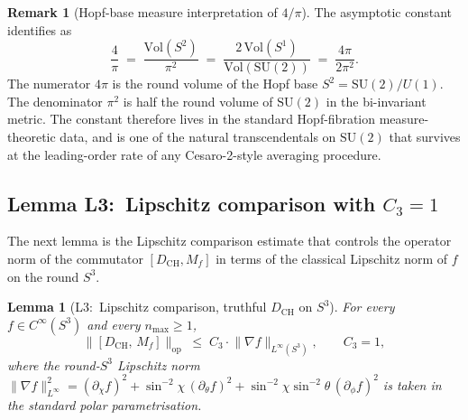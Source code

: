 \documentclass[11pt,a4paper]{article}
\theoremstyle{plain}
\newtheorem{lemma}[theorem]{Lemma}
\theoremstyle{definition}
\newtheorem{remark}[theorem]{Remark}
\newcommand{\nmax}{n_{\max}}
\newcommand{\sthree}{S^{3}}
\newcommand{\opnorm}[1]{\lVert #1 \rVert_{\mathrm{op}}}
\newcommand{\norm}[1]{\lVert #1 \rVert}
\newcommand{\SU}{\mathrm{SU}}
\newcommand{\Vol}{\mathrm{Vol}}
\newcommand{\Mat}{M}
\newcommand{\DCH}{D_{\mathrm{CH}}}
\begin{document}
\begin{remark}[Hopf-base measure interpretation of $4/\pi$]
The asymptotic constant identifies as
\begin{equation*}
   \frac{4}{\pi}
   \;=\; \frac{\Vol(S^2)}{\pi^2}
   \;=\; \frac{2\,\Vol(S^1)}{\Vol(\SU(2))}
   \;=\; \frac{4\pi}{2\pi^2}.
\end{equation*}
The numerator $4\pi$ is the round volume of the Hopf base
$S^2 = \SU(2)/U(1)$. The denominator $\pi^2$ is half the round volume
of $\SU(2)$ in the bi-invariant metric. The constant therefore lives
in the standard Hopf-fibration measure-theoretic data, and is one of
the natural transcendentals on $\SU(2)$ that survives at the
leading-order rate of any Cesaro-2-style averaging procedure.
\end{remark}

\subsection{Lemma L3:\ Lipschitz comparison with $C_3 = 1$}
\label{sec:L3}

The next lemma is the Lipschitz comparison estimate that controls the
operator norm of the commutator $[\DCH, \Mat_f]$ in terms of the
classical Lipschitz norm of $f$ on the round $\sthree$.

\begin{lemma}[L3:\ Lipschitz comparison, truthful $\DCH$ on $\sthree$]
\label{lem:L3}
For every $f \in C^\infty(\sthree)$ and every $\nmax \ge 1$,
\begin{equation}\label{eq:L3_main}
   \opnorm{[\DCH,\, \Mat_f]}
   \;\le\; C_3 \cdot \norm{\nabla f}_{L^\infty(\sthree)}, \qquad
   C_3 = 1,
\end{equation}
where the round-$\sthree$ Lipschitz norm
$\norm{\nabla f}_{L^\infty}^2 = (\partial_\chi f)^2 + \sin^{-2}\chi\,
(\partial_\theta f)^2 + \sin^{-2}\chi \sin^{-2}\theta\, (\partial_\phi f)^2$
is taken in the standard polar parametrisation.
\end{lemma}
\end{document}
